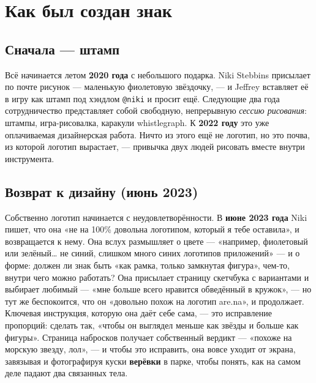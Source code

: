 \documentclass[10pt,letterpaper,twocolumn]{article}
\begin{document}
\section{Как был создан знак}

\subsection{Сначала --- штамп}
Всё начинается летом \textbf{2020 года} с небольшого подарка. Niki
Stebbins присылает по почте рисунок --- маленькую фиолетовую звёздочку, ---
и Jeffrey вставляет её в игру как штамп под хэндлом \texttt{@niki} и просит
ещё. Следующие два года сотрудничество представляет собой свободную,
непрерывную \emph{сессию рисования}: штампы, игра-рисовалка, каракули
whistlegraph. К \textbf{2022 году} это уже оплачиваемая дизайнерская
работа. Ничто из этого ещё не логотип, но это почва, из которой логотип
вырастает, --- привычка двух людей рисовать вместе внутри инструмента.

\subsection{Возврат к дизайну (июнь 2023)}
Собственно логотип начинается с неудовлетворённости. В \textbf{июне 2023
года} Niki пишет, что она «не на 100\% довольна логотипом, который я тебе
оставила», и возвращается к нему. Она вслух размышляет о цвете ---
«например, фиолетовый или зелёный\dots{} не синий, слишком много синих
логотипов приложений» --- и о форме: должен ли знак быть «как рамка, только
замкнутая фигура», чем-то, внутри чего можно работать? Она присылает
страницу скетчбука с вариантами и выбирает любимый --- «мне больше всего
нравится обведённый в кружок», --- но тут же беспокоится, что он «довольно
похож на логотип are.na», и продолжает. Ключевая инструкция, которую она
даёт себе сама, --- это исправление пропорций: сделать так, «чтобы он
выглядел меньше как звёзды и больше как фигуры». Страница набросков получает
собственный вердикт --- «похоже на морскую звезду, лол», --- и чтобы это
исправить, она вовсе уходит от экрана, завязывая и фотографируя куски
\textbf{верёвки} в парке, чтобы понять, как на самом деле падают два
связанных тела.
\end{document}
